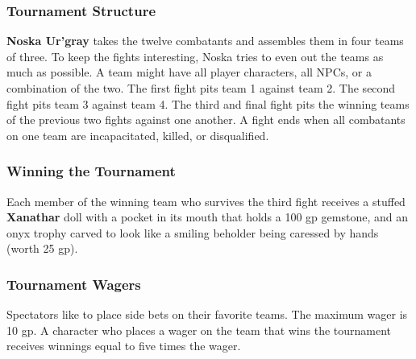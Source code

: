 \documentclass[10pt,a4paper,twoside,twocolumn,openany,nodeprecatedcode]{dndbook}
\begin{document}
\subsubsection{Tournament Structure}
\textbf{Noska Ur'gray} takes the twelve combatants and assembles them in four teams of three. To keep the fights interesting, Noska tries to even out the teams as much as possible. A team might have all player characters, all NPCs, or a combination of the two.
The first fight pits team 1 against team 2. The second fight pits team 3 against team 4. The third and final fight pits the winning teams of the previous two fights against one another. A fight ends when all combatants on one team are incapacitated, killed, or disqualified.
\subsubsection{Winning the Tournament}
Each member of the winning team who survives the third fight receives a stuffed \textbf{Xanathar} doll with a pocket in its mouth that holds a 100 gp gemstone, and an onyx trophy carved to look like a smiling beholder being caressed by hands (worth 25 gp).
\subsubsection{Tournament Wagers}
Spectators like to place side bets on their favorite teams. The maximum wager is 10 gp. A character who places a wager on the team that wins the tournament receives winnings equal to five times the wager.
\end{document}
